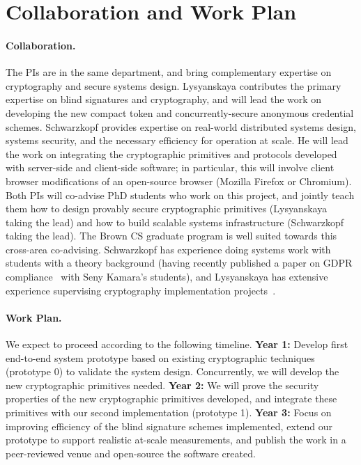 \section{Collaboration and Work Plan}

\paragraph{Collaboration.}
%
The PIs are in the same department, and bring complementary expertise on cryptography and secure systems design.
%
Lysyanskaya contributes the primary expertise on blind signatures and cryptography, and will lead the work on developing the new compact token and concurrently-secure anonymous credential schemes.
%
Schwarzkopf provides expertise on real-world distributed systems design, systems security, and the necessary efficiency for operation at scale.
%
He will lead the work on integrating the cryptographic primitives and protocols developed with server-side and client-side software; in particular, this will involve client browser modifications of an open-source browser (Mozilla Firefox or Chromium).
%
Both PIs will co-advise PhD students who work on this project, and jointly teach them how to design provably secure cryptographic primitives (Lysyanskaya taking the lead) and how to build scalable systems infrastructure (Schwarzkopf taking the lead).
%
The Brown CS graduate program is well suited towards this cross-area co-advising.
%
Schwarzkopf has experience doing systems work with students with a theory background (\eg having recently published a paper on GDPR compliance~\cite{gdprizer} with Seny Kamara's students), and Lysyanskaya has extensive experience supervising cryptography implementation projects~\cite{mekhl10,bhrlpb12,hzblpb13,bcdlrsy17}. 
%

\paragraph{Work Plan.}
%
We expect to proceed according to the following timeline.
%
\textbf{Year 1:} Develop first end-to-end system prototype based on existing cryptographic techniques (prototype 0) to validate the system design. Concurrently, we will develop the new cryptographic primitives needed.
%
\textbf{Year 2:} We will prove the security properties of the new cryptographic primitives developed, and integrate these primitives with our second implementation (prototype 1).
%
\textbf{Year 3:} Focus on improving efficiency of the blind signature schemes implemented, extend our prototype to support realistic at-scale measurements, and publish the work in a peer-reviewed venue and open-source the software created.
%
